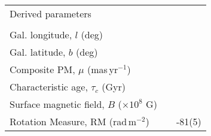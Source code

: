 \begin{table*}
\begin{minipage}{180mm}
\begin{tabular}{lll}
Derived parameters\\ 
\\ 
Gal. longitude, $l$ (deg) &  &  \\ 
 Gal. latitude, $b$ (deg) &  &  \\ 
 Composite PM, $\mu$ (mas\,yr$^{-1}$) & & \\ 
Characteristic age, $\tau_c$ (Gyr) & &  \\ 
 Surface magnetic field, $B$ ($\times 10^8$ G) &  &  \\ 
Rotation Measure, RM (rad\,m$^{-2}$) & & -81(5)\\
\hline
 \end{tabular}
\end{minipage}
\end{table*}
